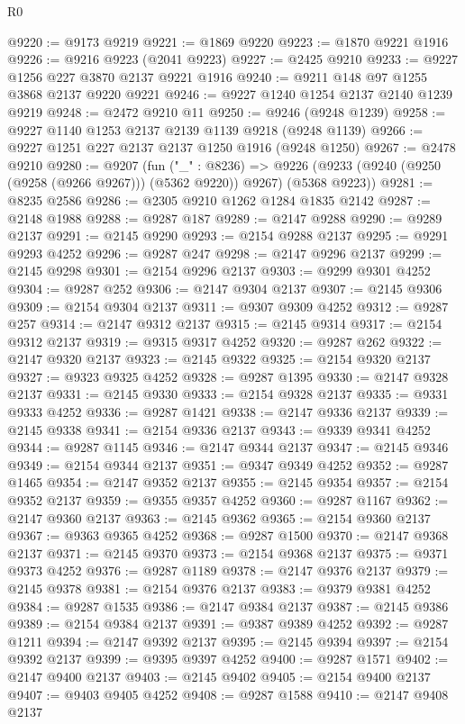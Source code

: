 \begin{lexlean}{R0}
\begin{coremodule}
@9220 := @9173 @9219
@9221 := @1869 @9220
@9223 := @1870 @9221 @1916
@9226 := @9216 @9223 (@2041 @9223)
@9227 := @2425 @9210
@9233 := @9227 @1256 @227 @3870 @2137 @9221 @1916
@9240 := @9211 @148 @97 @1255 @3868 @2137 @9220 @9221
@9246 := @9227 @1240 @1254 @2137 @2140 @1239 @9219
@9248 := @2472 @9210 @11
@9250 := @9246 (@9248 @1239)
@9258 := @9227 @1140 @1253 @2137 @2139 @1139 @9218 (@9248 @1139)
@9266 := @9227 @1251 @227 @2137 @2137 @1250 @1916 (@9248 @1250)
@9267 := @2478 @9210
@9280 := @9207
    (fun ("_" : @8236) =>
    @9226 (@9233 (@9240 (@9250 (@9258 (@9266 @9267))) (@5362 @9220)) @9267) (@5368 @9223))
@9281 := @8235 @2586
@9286 := @2305 @9210 @1262 @1284 @1835 @2142
@9287 := @2148 @1988
@9288 := @9287 @187
@9289 := @2147 @9288
@9290 := @9289 @2137
@9291 := @2145 @9290
@9293 := @2154 @9288 @2137
@9295 := @9291 @9293 @4252
@9296 := @9287 @247
@9298 := @2147 @9296 @2137
@9299 := @2145 @9298
@9301 := @2154 @9296 @2137
@9303 := @9299 @9301 @4252
@9304 := @9287 @252
@9306 := @2147 @9304 @2137
@9307 := @2145 @9306
@9309 := @2154 @9304 @2137
@9311 := @9307 @9309 @4252
@9312 := @9287 @257
@9314 := @2147 @9312 @2137
@9315 := @2145 @9314
@9317 := @2154 @9312 @2137
@9319 := @9315 @9317 @4252
@9320 := @9287 @262
@9322 := @2147 @9320 @2137
@9323 := @2145 @9322
@9325 := @2154 @9320 @2137
@9327 := @9323 @9325 @4252
@9328 := @9287 @1395
@9330 := @2147 @9328 @2137
@9331 := @2145 @9330
@9333 := @2154 @9328 @2137
@9335 := @9331 @9333 @4252
@9336 := @9287 @1421
@9338 := @2147 @9336 @2137
@9339 := @2145 @9338
@9341 := @2154 @9336 @2137
@9343 := @9339 @9341 @4252
@9344 := @9287 @1145
@9346 := @2147 @9344 @2137
@9347 := @2145 @9346
@9349 := @2154 @9344 @2137
@9351 := @9347 @9349 @4252
@9352 := @9287 @1465
@9354 := @2147 @9352 @2137
@9355 := @2145 @9354
@9357 := @2154 @9352 @2137
@9359 := @9355 @9357 @4252
@9360 := @9287 @1167
@9362 := @2147 @9360 @2137
@9363 := @2145 @9362
@9365 := @2154 @9360 @2137
@9367 := @9363 @9365 @4252
@9368 := @9287 @1500
@9370 := @2147 @9368 @2137
@9371 := @2145 @9370
@9373 := @2154 @9368 @2137
@9375 := @9371 @9373 @4252
@9376 := @9287 @1189
@9378 := @2147 @9376 @2137
@9379 := @2145 @9378
@9381 := @2154 @9376 @2137
@9383 := @9379 @9381 @4252
@9384 := @9287 @1535
@9386 := @2147 @9384 @2137
@9387 := @2145 @9386
@9389 := @2154 @9384 @2137
@9391 := @9387 @9389 @4252
@9392 := @9287 @1211
@9394 := @2147 @9392 @2137
@9395 := @2145 @9394
@9397 := @2154 @9392 @2137
@9399 := @9395 @9397 @4252
@9400 := @9287 @1571
@9402 := @2147 @9400 @2137
@9403 := @2145 @9402
@9405 := @2154 @9400 @2137
@9407 := @9403 @9405 @4252
@9408 := @9287 @1588
@9410 := @2147 @9408 @2137

\end{coremodule}
\end{lexlean}
